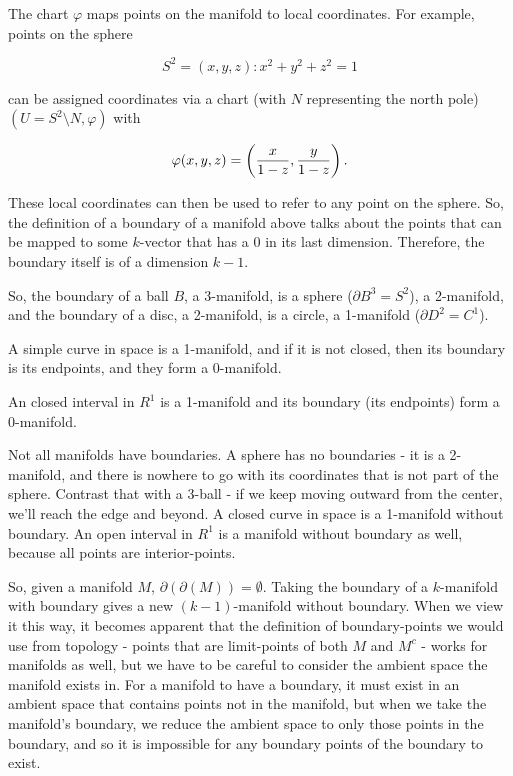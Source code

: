 \documentclass{article}
\begin{document}
\begin{remark}
The \@{chart} $\varphi$ maps points on the manifold to local coordinates. For example, points on the sphere

\[ S^2  = {(x,y,z) : x^2 + y^2 + z^2 = 1} \]

can be assigned coordinates via a chart (with $N$ representing the north pole) $(U = S^2 \setminus {N}, \varphi)$ with

\[ \varphi(x,y,z) = \left(\frac{x}{1 - z}, \frac{y}{1 - z}\right). \]

These local coordinates can then be used to refer to any point on the sphere. So, the definition of a \@{boundary} of a manifold above talks about the points that can be mapped to some $k$-vector that has a $0$ in its last dimension. Therefore, the boundary itself is of a dimension $k - 1.$

So, the \@{boundary} of a ball $B$, a 3-manifold, is a sphere ($\partial B^3 = S^2$), a 2-manifold, and the boundary of a disc, a 2-manifold, is a circle, a 1-manifold ($\partial D^2 = C^1$).

A simple curve in space is a 1-manifold, and if it is not closed, then its boundary is its endpoints, and they form a 0-manifold.

An closed \@{interval} in $R^1$ is a 1-manifold and its boundary (its endpoints) form a 0-manifold.

Not all manifolds have boundaries. A sphere has no boundaries - it is a 2-manifold, and there is nowhere to go with its coordinates that is not part of the sphere. Contrast that with a 3-ball - if we keep moving outward from the center, we'll reach the edge and beyond. A closed curve in space is a 1-manifold without boundary. An open interval in $R^1$ is a manifold without boundary as well, because all points are \@{interior-points}.

So, given a manifold $M$, $\partial(\partial(M)) = \emptyset.$ Taking the boundary of a $k$-manifold with boundary gives a new $(k-1)$-manifold without boundary. When we view it this way, it becomes apparent that the definition of \@{boundary-points} we would use from topology - points that are \@{limit-points} of both $M$ and $M^c$ - works for \@{manifolds} as well, but we have to be careful to consider the ambient space the manifold exists in. For a manifold to have a boundary, it must exist in an ambient space that contains points not in the manifold, but when we take the manifold's boundary, we reduce the ambient space to only those points in the boundary, and so it is impossible for any boundary points of the boundary to exist.
\end{remark}
\end{document}
